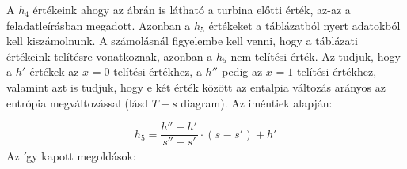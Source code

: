 \noindent A $h_{4}$ értékeink ahogy az ábrán is látható a turbina előtti érték, az-az a feladatleírásban megadott. Azonban a $h_{5}$ értékeket a táblázatból nyert adatokból kell kiszámolnunk. A számolásnál figyelembe kell venni, hogy a táblázati értékeink telítésre vonatkoznak, azonban a $h_{5}$ nem telítési érték. Az tudjuk, hogy a $h'_{}$ értékek az $x_{}=0$ telítési értékhez, a $h''_{}$ pedig az $x_{}=1$ telítési értékhez, valamint azt is tudjuk, hogy e két érték között az entalpia változás arányos az entrópia megváltozással (lásd $T-s$ diagram). Az iméntiek alapján:

\begin{equation*}
h_{5}=\dfrac{h''_{}-h'_{}}{s''_{}-s'{}} \cdot (s_{}-s'_{}) + h'_{}
\end{equation*}
\pagebreak
\noindent Az így kapott megoldások:
\begin{figure}[h]
	\centering
	\label{figure:sm}
\end{figure}

